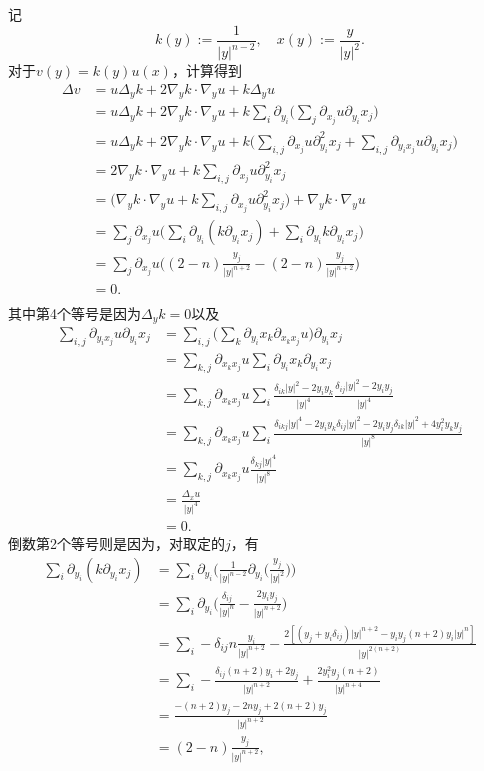 \begin{itemize}
\begin{proofc}
记
$$k(y):=\frac{1}{|y|^{n-2}},\quad x(y):=\frac{y}{|y|^2}.$$
对于$v(y)=k(y)u(x)$，计算得到
\begin{align*}
	\Delta v 
	&= u\Delta_y k +2 \nabla_y k \cdot\!\nabla_y u+k \Delta_y u \\
    &= u\Delta_y k +2 \nabla_y k \cdot\!\nabla_y u+k \sum_i\partial_{y_i}\Big(\sum_j\partial_{x_j}u\partial_{y_i}x_j\Big) \\
	&=u\Delta_y k +2 \nabla_y k \cdot\!\nabla_y u+k \Big(\sum_{i,j}\partial_{x_j}u\partial_{y_i}^2x_j+\sum_{i,j}\partial_{y_i x_j}  u\partial_{y_i}x_j\Big) \\
	&=2 \nabla_y k \cdot\!\nabla_y u+k \sum_{i,j}\partial_{x_j}u\partial_{y_i}^2x_j \\
	&=\Big(\nabla_y k \cdot\!\nabla_y u+k \sum_{i,j}\partial_{x_j}u\partial_{y_i}^2x_j\Big)+\nabla_y k \cdot\!\nabla_y u\\
	&=\sum_j \partial_{x_j} u\Big(\sum_i \partial _{y_i}(k\partial_{y_i} x_j)+\sum_i \partial _{y_i}k \partial_{y_i} x_j\Big)\\
	&=\sum_j \partial_{x_j} u\Big((2-n)\frac{y_j}{|y|^{n+2}}-(2-n)\frac{y_j}{|y|^{n+2}}\Big)\\
	&=0.\\
	\end{align*}
其中第4个等号是因为$\Delta_y k=0$以及
\begin{align*}
    \sum_{i,j}\partial_{y_i x_j}  u\partial_{y_i}x_j
    &=\sum_{i,j}\Big(\sum_k \partial_{y_i}x_k\partial_{x_kx_j}u\Big) \partial_{y_i}x_j\\
    &=\sum_{k,j}\partial_{x_kx_j}u\sum_i\partial_{y_i}x_k\partial_{y_i}x_j\\
    &=\sum_{k,j}\partial_{x_kx_j}u\sum_i\frac{\delta_{ik}|y|^2-2y_iy_k}{|y|^4}\frac{\delta_{ij}|y|^2-2y_iy_j}{|y|^4}\\
    &=\sum_{k,j}\partial_{x_kx_j}u\sum_i\frac{\delta_{ikj}|y|^4-2y_iy_k\delta_{ij}|y|^2-2y_iy_j\delta_{ik}|y|^2+4y_i^2y_ky_j}{|y|^8}\\
    &=\sum_{k,j}\partial_{x_kx_j}u\frac{\delta_{kj}|y|^4}{|y|^8}\\
    &=\frac{\Delta_x u}{|y|^4}\\
    &=0.
\end{align*}
倒数第2个等号则是因为，对取定的$j$，有
\begin{align*}
    \sum_{i}\partial_{y_i}(k\partial_{y_i}x_j)
    &=\sum_i\partial_{y_i}\bigg(\frac{1}{|y|^{n-2}}
    \partial_{y_i}\Big(\frac{y_j}{|y|^2}\Big)\bigg)\\
    &=\sum_{i}\partial_{y_i}\bigg(\frac{\delta_{ij}}{|y|^n}
    -\frac{2y_iy_j}{|y|^{n+2}}\bigg)\\
    &=\sum_i-\delta_{ij}n\frac{y_i}{|y|^{n+2}}-\frac{2[(y_j+y_i\delta_{ij})|y|^{n+2}-y_iy_j(n+2)y_i|y|^n]}{|y|^{2(n+2)}}\\
    &=\sum_{i}-\frac{\delta_{ij}(n+2)y_i+2y_j}{|y|^{n+2}}+\frac{2y_i^2y_j(n+2)}{|y|^{n+4}}\\
    &=\frac{-(n+2)y_j-2ny_j+2(n+2)y_j}{|y|^{n+2}}\\
    &=(2-n)\frac{y_j}{|y|^{n+2}},\\


\end{align*}
\end{proofc}
\end{itemize}

